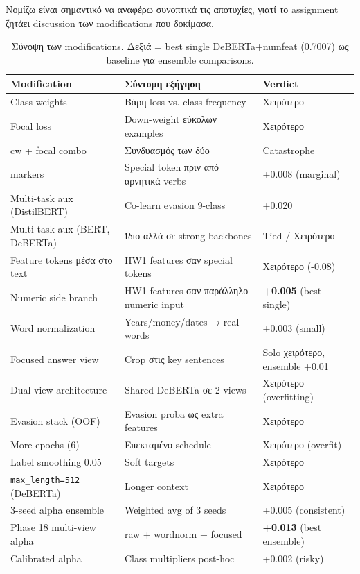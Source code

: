 \documentclass[12pt]{fphw}
\begin{document}
Νομίζω είναι σημαντικό να αναφέρω συνοπτικά τις αποτυχίες, γιατί το assignment ζητάει discussion των modifications που δοκίμασα.

\begin{table}[H]
\centering
\small
\begin{tabularx}{\textwidth}{lXl}
\toprule
Modification & Σύντομη εξήγηση & Verdict \\
\midrule
Class weights & Βάρη loss vs. class frequency & Χειρότερο \\
Focal loss & Down-weight εύκολων examples & Χειρότερο \\
cw + focal combo & Συνδυασμός των δύο & Catastrophe \\
[NEG] markers & Special token πριν από αρνητικά verbs & +0.008 (marginal) \\
Multi-task aux (DistilBERT) & Co-learn evasion 9-class & +0.020 \\
Multi-task aux (BERT, DeBERTa) & Ίδιο αλλά σε strong backbones & Tied / Χειρότερο \\
Feature tokens μέσα στο text & HW1 features σαν special tokens & Χειρότερο (-0.08) \\
Numeric side branch & HW1 features σαν παράλληλο numeric input & \textbf{+0.005} (best single) \\
Word normalization & Years/money/dates → real words & +0.003 (small) \\
Focused answer view & Crop στις key sentences & Solo χειρότερο, ensemble +0.01 \\
Dual-view architecture & Shared DeBERTa σε 2 views & Χειρότερο (overfitting) \\
Evasion stack (OOF) & Evasion proba ως extra features & Χειρότερο \\
More epochs (6) & Επεκταμένο schedule & Χειρότερο (overfit) \\
Label smoothing 0.05 & Soft targets & Χειρότερο \\
\texttt{max\_length=512} (DeBERTa) & Longer context & Χειρότερο \\
3-seed alpha ensemble & Weighted avg of 3 seeds & +0.005 (consistent) \\
Phase 18 multi-view alpha & raw + wordnorm + focused & \textbf{+0.013} (best ensemble) \\
Calibrated alpha & Class multipliers post-hoc & +0.002 (risky) \\
\bottomrule
\end{tabularx}
\caption{Σύνοψη των modifications. Δεξιά = best single DeBERTa+numfeat (0.7007) ως baseline για ensemble comparisons.}
\label{tab:mods}
\end{table}
\end{document}

